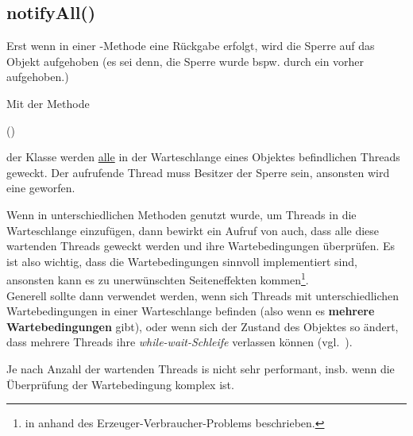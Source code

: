 \subsection{notifyAll()}\label{subsec:notifyAll}

Erst wenn in einer -Methode eine Rückgabe erfolgt, wird die Sperre auf das Objekt aufgehoben (es sei denn, die Sperre wurde bspw. durch ein  vorher aufgehoben.)

\noindent
Mit der Methode

\begin{center}
     ()
\end{center}

\noindent
der Klasse  werden \ul{alle} in der Warteschlange eines Objektes befindlichen Threads geweckt.
\noindent
Der aufrufende Thread muss Besitzer der Sperre sein, ansonsten wird eine  geworfen.

\begin{tcolorbox}[enlarge top by=0.5cm,enlarge bottom by=0.5cm]
Wenn in unterschiedlichen Methoden  genutzt wurde, um Threads in die Warteschlange einzufügen, dann bewirkt ein Aufruf von  auch, dass alle diese wartenden Threads geweckt werden und ihre Wartebedingungen überprüfen.
Es ist also wichtig, dass die Wartebedingungen sinnvoll implementiert sind, ansonsten kann es zu unerwünschten Seiteneffekten kommen\footnote {
    in \cite[70 f.]{Oec22} anhand des Erzeuger-Verbraucher-Problems beschrieben.
}.\\
Generell sollte  dann verwendet werden, wenn sich Threads mit unterschiedlichen Wartebedingungen in einer Warteschlange befinden (also wenn es \textbf{mehrere Wartebedingungen} gibt), oder wenn sich der Zustand des Objektes so ändert, dass mehrere Threads ihre \textit{while-wait-Schleife} verlassen können (vgl.~\cite[73]{Oec22}).
\end{tcolorbox}


\noindent
Je nach Anzahl der wartenden Threads is  nicht sehr performant, insb. wenn die Überprüfung der Wartebedingung komplex ist.

